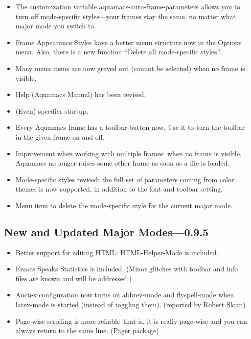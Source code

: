\begin{itemize}
\item The customization variable aquamacs-auto-frame-parameters allows you to
        turn off mode-specific styles---your frames stay the same, no
        matter what major mode you switch to.

\item Frame Appearance Styles have a better menu structure now in the Options
        menu. Also, there is a new function ``Delete all mode-specific
        styles''.

\item Many menu items are now greyed out (cannot be selected) when no frame is visible.

\item Help (Aquamacs Manual) has been revised.



\item (Even) speedier startup.



\item Every Aquamacs frame has a toolbar-button now. Use it to turn the
        toolbar in the given frame on and off.



\item Improvement when working with multiple frames: when no frame is visible,
        Aquamacs no longer raises some other frame as soon as a file is
        loaded.



\item Mode-specific styles revised: the full set of parameters coming from
        color themes is now supported, in addition to the font and toolbar setting.

\item Menu item to delete the mode-specific style for the current major mode.


\end{itemize}



\subsection{New and Updated Major Modes---0.9.5}
\begin{itemize}

\item Better support for editing HTML: HTML-Helper-Mode is included.

\item Emacs Speaks Statistics is included. (Minor glitches with toolbar and  info
    files are known and will be addressed.)

\item Auctex configuration now turns on abbrev-mode and flyspell-mode when
    latex-mode is started (instead of toggling them).
    (reported by Robert Sloan)

\item Page-wise scrolling is more reliable--that is, it is really page-wise and
    you can always return to the same line. (Pager package)
\end{itemize}

